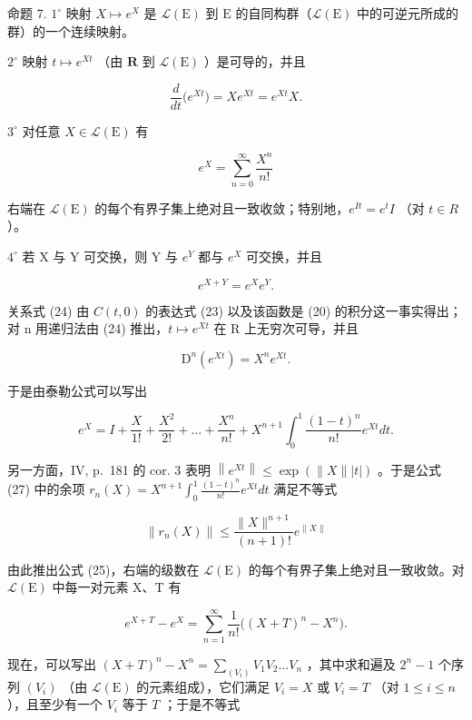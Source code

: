 命题 7. \(1^{\circ}\) 映射 \(X \mapsto e^{X}\) 是 \(\mathcal{L}(\mathrm{E})\) 到 \(\mathrm{E}\) 的自同构群（\(\mathcal{L}(\mathrm{E})\) 中的可逆元所成的群）的一个连续映射。

\(2^{\circ}\) 映射 \(t\mapsto e^{Xt}\) （由 \(\mathbf{R}\) 到 \(\mathcal{L}(\mathrm{E})\) ）是可导的，并且

\[
\frac {d}{d t} \big (e ^ {X t} \big) = X e ^ {X t} = e ^ {X t} X.\tag{24}
\]

\(3^{\circ}\) 对任意 \(X\in \mathcal{L}(\mathrm{E})\) 有

\[
e ^ {X} = \sum_ {n = 0} ^ {\infty} \frac {X ^ {n}}{n !}\tag{25}
\]

右端在 \(\mathcal{L}(\mathrm{E})\) 的每个有界子集上绝对且一致收敛；特别地，\(e^{It} = e^{t}I\) （对 \(t \in R\) ）。

\(4^{\circ}\) 若 X 与 Y 可交换，则 Y 与 \(e^{Y}\) 都与 \(e^{X}\) 可交换，并且

\[
e ^ {X + Y} = e ^ {X} e ^ {Y}.\tag{26}
\]

关系式 (24) 由 \(C(t,0)\) 的表达式 (23) 以及该函数是 (20) 的积分这一事实得出；对 n 用递归法由 (24) 推出，\(t \mapsto e^{Xt}\) 在 R 上无穷次可导，并且

\[
\mathrm{D} ^ {n} \left(e ^ {X t}\right) = X ^ {n} e ^ {X t}.
\]

于是由泰勒公式可以写出

\[
e ^ {X} = I + \frac {X}{1 !} + \frac {X ^ {2}}{2 !} + \dots + \frac {X ^ {n}}{n !} + X ^ {n + 1} \int_ {0} ^ {1} \frac {(1 - t) ^ {n}}{n !} e ^ {X t} d t.\tag{27}
\]

另一方面，IV, p.~181 的 cor. 3 表明 \(\left\| e^{Xt}\right\| \leqslant \exp \left(\| X\| |t|\right)\) 。于是公式 (27) 中的余项 \(r_n(X) = X^{n + 1}\int_0^1\frac{(1 - t)^n}{n!} e^{Xt}dt\) 满足不等式

\[
\| r _ {n} (X) \| \leqslant \frac {\| X \| ^ {n + 1}}{(n + 1) !} e ^ {\| X \|}
\]

由此推出公式 (25)，右端的级数在 \(\mathcal{L}(\mathrm{E})\) 的每个有界子集上绝对且一致收敛。对 \(\mathcal{L}(\mathrm{E})\) 中每一对元素 X、T 有

\[
e ^ {X + T} - e ^ {X} = \sum_ {n = 1} ^ {\infty} \frac {1}{n !} \big ((X + T) ^ {n} - X ^ {n} \big).
\]

现在，可以写出 \((X + T)^n - X^n = \sum_{(V_i)} V_1 V_2 \ldots V_n\) ，其中求和遍及 \(2^n - 1\) 个序列 \((V_i)\) （由 \(\mathcal{L}(\mathrm{E})\) 的元素组成），它们满足 \(V_i = X\) 或 \(V_i = T\) （对 \(1 \leqslant i \leqslant n\) ），且至少有一个 \(V_i\) 等于 \(T\) ；于是不等式

